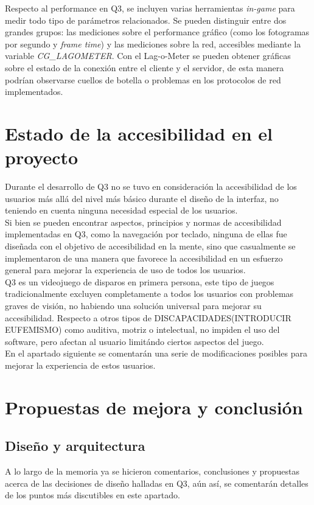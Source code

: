 \documentclass[a4paper,12pt]{report}
\begin{document}
    Respecto al performance en Q3, se incluyen varias herramientas\textit{ in-game }para medir todo tipo de parámetros relacionados. Se pueden distinguir entre dos grandes grupos: las mediciones sobre el performance gráfico (como los fotogramas por segundo y \textit{frame time}) y las mediciones sobre la red, accesibles mediante la variable \textit{CG\_LAGOMETER}. Con el Lag-o-Meter se pueden obtener gráficas sobre el estado de la conexión entre el cliente y el servidor, de esta manera podrían observarse cuellos de botella o problemas en los protocolos de red implementados.
	
	\section{Estado de la accesibilidad en el proyecto}
    Durante el desarrollo de Q3 no se tuvo en consideración la accesibilidad de los usuarios más allá del nivel más básico durante el diseño de la interfaz, no teniendo en cuenta ninguna necesidad especial de los usuarios. \\
    
    Si bien se pueden encontrar aspectos, principios y normas de accesibilidad implementadas en Q3, como la navegación por teclado, ninguna de ellas fue diseñada con el objetivo de accesibilidad en la mente, sino que casualmente se implementaron de una manera que favorece la accesibilidad en un esfuerzo general para mejorar la experiencia de uso de todos los usuarios.\\
    
    Q3 es un videojuego de disparos en primera persona, este tipo de juegos tradicionalmente excluyen completamente a todos los usuarios con problemas graves de visión, no habiendo una solución universal para mejorar su accesibilidad. Respecto a otros tipos de DISCAPACIDADES(INTRODUCIR EUFEMISMO) como auditiva, motriz o intelectual, no impiden el uso del software, pero afectan al usuario limitándo ciertos aspectos del juego.\\
    
    En el apartado siguiente se comentarán una serie de modificaciones posibles para mejorar la experiencia de estos usuarios.
    
	
	\section{Propuestas de mejora y conclusión}
	
    \subsection{Diseño y arquitectura}
    A lo largo de la memoria ya se hicieron comentarios, conclusiones y propuestas acerca de las decisiones de diseño halladas en Q3, aún así, se comentarán detalles de los puntos más discutibles en este apartado.\\
    
\end{document}

